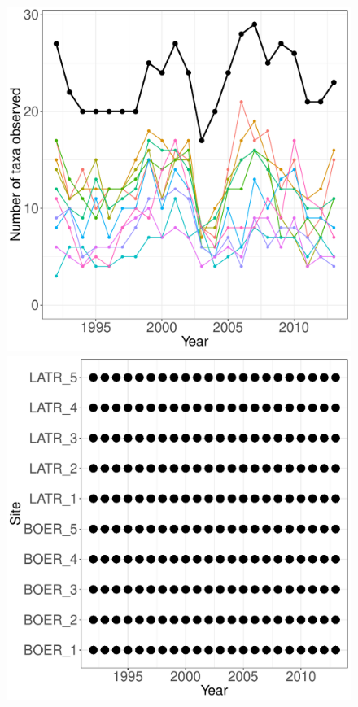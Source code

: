 \documentclass[11pt, oneside]{article}
\begin{document}
\begin{figure}[h!]
\includegraphics[scale = 0.4]{sev-grasshopper-compagnoni_num_taxa_over_time.pdf}
\includegraphics[scale = 0.4]{sev-grasshopper-compagnoni_spatiotemporal_sampling_effort.pdf}

\end{figure}
\end{document}
